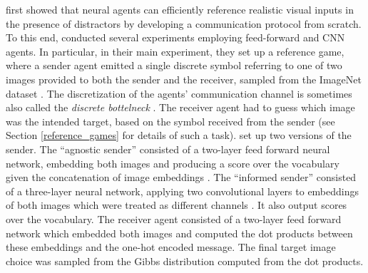 \cite{lazaridou2016multi} first showed that neural agents can efficiently reference realistic visual inputs in the presence of distractors by developing a communication protocol from scratch. To this end, \textcite{lazaridou2016multi} conducted several experiments employing feed-forward and CNN agents. In particular, in their main experiment, they set up a reference game, where a sender agent emitted a single discrete symbol referring to one of two images provided to both the sender and the receiver, sampled from the ImageNet dataset \parencite{deng2009imagenet}. The discretization of the agents' communication channel is sometimes also called the \textit{discrete bottelneck} \parencite{lazaridou2020emergent}. 
The receiver agent had to guess  which image was the intended target, based on the symbol received from the sender (see Section \ref{reference_games} for details of such a task). %
\cite{lazaridou2016multi} set up two versions of the sender. The ``agnostic sender'' consisted of a two-layer feed forward neural network, embedding both images and producing a score over the vocabulary given the concatenation of image embeddings \parencite[][p. 3]{lazaridou2016multi}. The ``informed sender'' consisted of a three-layer neural network, applying two convolutional layers to embeddings of both images which were treated as different channels \parencite[][p.~3]{lazaridou2016multi}. It also output scores over the vocabulary. %
The receiver agent consisted of a two-layer feed forward network which embedded both images and computed the dot products between these embeddings and the one-hot encoded message. The final target image choice was sampled from the Gibbs distribution computed from the dot products. %
